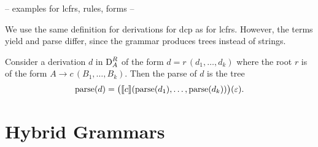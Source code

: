 \documentclass[../document.tex]{subfiles}
\begin{document}
    \begin{example}
    -- examples for lcfrs, rules, forms --
    \end{example}

    We use the same definition for derivations for \gls{dcp} as for \gls{lcfrs}.
    However, the terms yield and parse differ, since the grammar produces trees instead of strings.


    \begin{definition}
        Consider a derivation \(d\) in \(\operatorname{D}^R_A\) of the form \(d = r\,(d_1, \ldots, d_k)\) where the root \(r\) is of the form \(A \to c\,(B_1, \ldots, B_k)\).
        Then the parse of \(d\) is the tree \[
            \operatorname{parse}(d) = \big(\llbracket c\rrbracket(\operatorname{parse}(d_1),\ldots,\operatorname{parse}(d_k))\big)(\varepsilon) \text{.}
        \]
    \end{definition}


    \section{Hybrid Grammars}

    \ifSubfilesClassLoaded{%
        \printunsrtglossaries
    }{}
\end{document}
